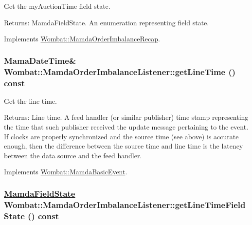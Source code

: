 Get the my\-Auction\-Time field state. 

\begin{Desc}
\item[Returns:]Mamda\-Field\-State. An enumeration representing field state. \end{Desc}


Implements \hyperlink{classWombat_1_1MamdaOrderImbalanceRecap_bb7f149026c917f1a04059c7bf2cc22f}{Wombat::Mamda\-Order\-Imbalance\-Recap}.\hypertarget{classWombat_1_1MamdaOrderImbalanceListener_39ab83f80c21af82d0327dbb11a517d3}{
\subsubsection[getLineTime]{\setlength{\rightskip}{0pt plus 5cm}Mama\-Date\-Time\& Wombat::Mamda\-Order\-Imbalance\-Listener::get\-Line\-Time () const}}
\label{classWombat_1_1MamdaOrderImbalanceListener_39ab83f80c21af82d0327dbb11a517d3}


Get the line time. 

\begin{Desc}
\item[Returns:]Line time. A feed handler (or similar publisher) time stamp representing the time that such publisher received the update message pertaining to the event. If clocks are properly synchronized and the source time (see above) is accurate enough, then the difference between the source time and line time is the latency between the data source and the feed handler. \end{Desc}


Implements \hyperlink{classWombat_1_1MamdaBasicEvent_3fcc26fa1a6446bcec12b11ac74ed26d}{Wombat::Mamda\-Basic\-Event}.\hypertarget{classWombat_1_1MamdaOrderImbalanceListener_e5911efbbda1cb87fb25f7869a01a103}{
\subsubsection[getLineTimeFieldState]{\setlength{\rightskip}{0pt plus 5cm}\hyperlink{namespaceWombat_93aac974f2ab713554fd12a1fa3b7d2a}{Mamda\-Field\-State} Wombat::Mamda\-Order\-Imbalance\-Listener::get\-Line\-Time\-Field\-State () const}}
\label{classWombat_1_1MamdaOrderImbalanceListener_e5911efbbda1cb87fb25f7869a01a103}


